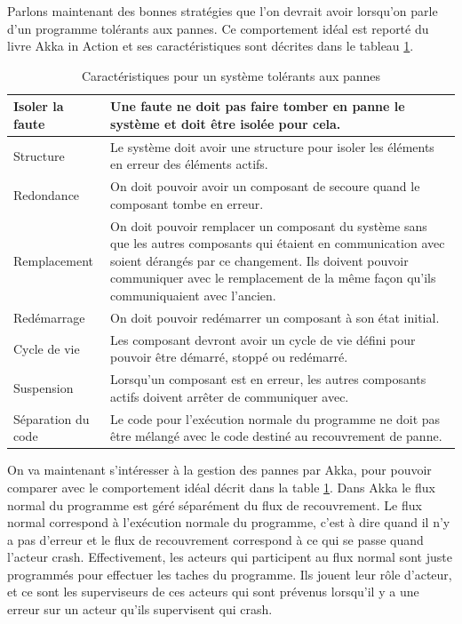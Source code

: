 \documentclass[11pt, a4paper]{article}
\begin{document}
\par Parlons maintenant des bonnes stratégies que l'on devrait avoir lorsqu'on parle d'un programme tolérants aux pannes. Ce comportement idéal est reporté du livre Akka in Action \cite{roestenburg2015akka} et ses caractéristiques sont décrites dans le tableau \ref{table1}.
\newline

\begin{table}[h]
\centering
\begin{tabular}{|l|p{}|}
\hline
Isoler la faute & Une faute ne doit pas faire tomber en panne le système et doit être isolée pour cela.\\ \hline
Structure & Le système doit avoir une structure pour isoler les éléments en erreur des éléments actifs. \\ \hline
Redondance & On doit pouvoir avoir un composant de secoure quand le composant tombe en erreur.\\ \hline
Remplacement & On doit pouvoir remplacer un composant du système sans que les autres composants qui étaient en communication avec soient dérangés par ce changement. Ils doivent pouvoir communiquer avec le remplacement de la même façon qu'ils communiquaient avec l'ancien. \\ \hline
Redémarrage & On doit pouvoir redémarrer un composant à son état initial. \\ \hline
Cycle de vie & Les composant devront avoir un cycle de vie défini pour pouvoir être démarré, stoppé ou redémarré. \\ \hline
Suspension & Lorsqu'un composant est en erreur, les autres composants actifs doivent arrêter de communiquer avec. \\ \hline
Séparation du code & Le code pour l’exécution normale du programme ne doit pas être mélangé avec le code destiné au recouvrement de panne. \\ \hline
\end{tabular}
\caption{Caractéristiques pour un système tolérants aux pannes}
\label{table1}
\end{table}
\par On va maintenant s'intéresser à la gestion des pannes par Akka, pour pouvoir comparer avec le comportement idéal décrit dans la table \ref{table1}. Dans Akka le flux normal du programme est géré séparément du flux de recouvrement. Le flux normal correspond à l’exécution normale du programme, c'est à dire quand il n'y a pas d'erreur et le flux de recouvrement correspond à ce qui se passe quand l'acteur crash. Effectivement, les acteurs qui participent au flux normal sont juste programmés pour effectuer les taches du programme. Ils jouent leur rôle d'acteur, et ce sont les superviseurs de ces acteurs qui sont prévenus lorsqu'il y a une erreur sur un acteur qu'ils supervisent qui crash. 
\end{document}
